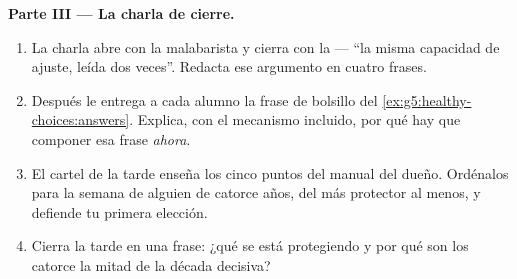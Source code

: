 \begin{problem}
\medskip\noindent\textbf{Parte III --- La charla de cierre.}
\begin{enumerate}[resume]
  \item La charla abre con la malabarista y cierra con la  ---
        ``la misma capacidad de ajuste, leída dos veces''. Redacta ese
        argumento en cuatro frases.
  \item Después le entrega a cada alumno la frase de bolsillo del
        \cref{ex:g5:healthy-choices:answers}. Explica, con el mecanismo
        incluido, por qué hay que componer esa frase \emph{ahora}.
  \item El cartel de la tarde enseña los cinco puntos del manual del
        dueño. Ordénalos para la semana de alguien de catorce años, del
        más protector al menos, y defiende tu primera elección.
  \item Cierra la tarde en una frase: ¿qué se está protegiendo y por
        qué son los catorce la mitad de la década decisiva?
\end{enumerate}
\end{problem}
